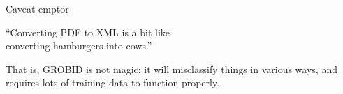 \documentclass[10pt]{beamer}
\begin{document}
  \begin{frame}{Caveat emptor}
    \begin{framed}
      ``Converting PDF to XML is a bit like\\ converting hamburgers into cows.''

      \vspace{0.25cm}

      \hspace*{}
    \end{framed}

    \vspace{0.5cm}

    That is, GROBID is not magic: it will misclassify things in various ways,
    and requires lots of training data to function properly.
  \end{frame}

  \begin{frame}[plain]
  \end{frame}
\end{document}
